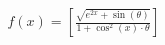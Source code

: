 \documentclass[preview]{standalone}
\begin{document}
\begin{align*}
f(x) = \left[ \frac{\sqrt{e^{2x} + \sin(\theta)} }{1 + \cos^2(x) \cdot \theta} \right]
\end{align*}
\end{document}
